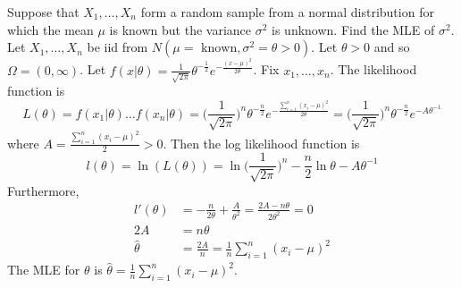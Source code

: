 \documentclass[12pt]{article}
\begin{document}
Suppose that $X_1,\dots,X_n$ form a random sample from a normal distribution for which the mean $\mu$ is known but the variance $\sigma^2$ is unknown. Find the MLE of $\sigma^2$. \\ 
Let $X_1,\dots,X_n$ be iid from $N(\mu = \text{ known}, \sigma^2 = \theta > 0)$. Let $\theta > 0$ and so $\Omega = (0, \infty)$. Let $f(x|\theta) = \frac{1}{\sqrt{2\pi}}\theta^{-\frac{1}{2}}e^{-\frac{(x-\mu)^2}{2\theta}}$. Fix $x_1,\dots,x_n$. The likelihood function is 
$$L(\theta) = f(x_1|\theta)\dots f(x_n|\theta) = \Big( \frac{1}{\sqrt{2\pi}}\Big)^n \theta^{-\frac{n}{2}}e^{-\frac{\sum_{i=1}^n (x_i - \mu)^2}{2\theta}} = \Big(\frac{1}{\sqrt{2\pi}}\Big)^n\theta^{-\frac{n}{2}}e^{-A\theta^{-1}}$$
 where $A = \frac{\sum_{i=1}^n (x_i - \mu)^2}{2} > 0$. Then the log likelihood function is $$l(\theta) = \ln(L(\theta)) = \ln\Big( \frac{1}{\sqrt{2\pi}} \Big)^n - \frac{n}{2}\ln \theta - A\theta^{-1}$$
Furthermore, $$ \begin{aligned} l'(\theta) &= -\frac{n}{2\theta} + \frac{A}{\theta^2} = \frac{2A - n\theta}{2\theta^2} = 0 \\ 2A &= n\theta \\ \hat{\theta} &= \frac{2A}{n} = \frac{1}{n} \sum_{i=1}^n (x_i - \mu)^2 \end{aligned} $$ 
The MLE for $\theta$ is $\hat{\theta} = \frac{1}{n} \sum_{i=1}^n (x_i - \mu)^2$. \\~\\
\end{document}
